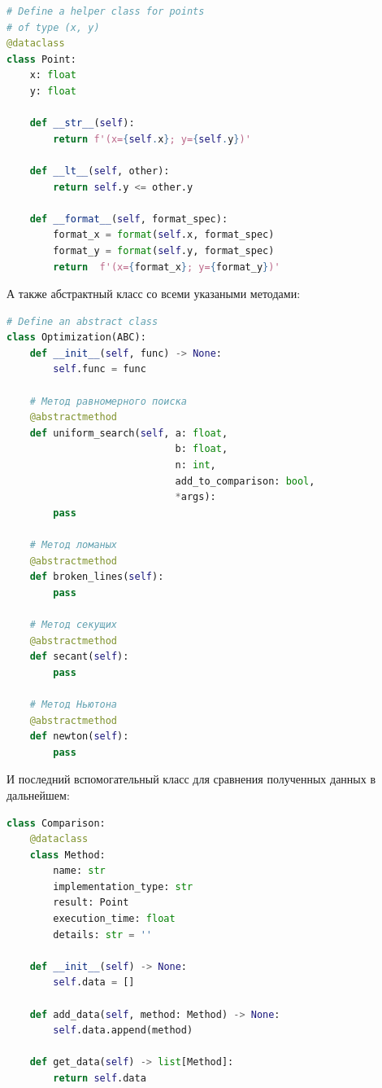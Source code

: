 \documentclass[a4paper, 14pt]{extarticle}
\begin{document}
\begin{center}
    \begin{lstlisting}[language=Python]
# Define a helper class for points 
# of type (x, y)
@dataclass
class Point:
    x: float
    y: float

    def __str__(self):
        return f'(x={self.x}; y={self.y})'
    
    def __lt__(self, other):
        return self.y <= other.y
    
    def __format__(self, format_spec):
        format_x = format(self.x, format_spec)
        format_y = format(self.y, format_spec)
        return  f'(x={format_x}; y={format_y})'
    \end{lstlisting}
\end{center}

А также абстрактный класс со всеми указаными методами:

\begin{center}
    \begin{lstlisting}[language=Python]
# Define an abstract class
class Optimization(ABC):
    def __init__(self, func) -> None:
        self.func = func   

    # Метод равномерного поиска
    @abstractmethod
    def uniform_search(self, a: float, 
                             b: float,
                             n: int,
                             add_to_comparison: bool,
                             *args):
        pass

    # Метод ломаных
    @abstractmethod
    def broken_lines(self):
        pass

    # Метод секущих
    @abstractmethod
    def secant(self):
        pass

    # Метод Ньютона
    @abstractmethod
    def newton(self):
        pass
    \end{lstlisting}
\end{center}

И последний вспомогательный класс для сравнения полученных данных в дальнейшем:

\begin{center}
    \begin{lstlisting}[language=Python]
class Comparison:
    @dataclass
    class Method:
        name: str
        implementation_type: str
        result: Point
        execution_time: float
        details: str = ''

    def __init__(self) -> None:
        self.data = []

    def add_data(self, method: Method) -> None:
        self.data.append(method)
    
    def get_data(self) -> list[Method]:
        return self.data
    \end{lstlisting}
\end{center}
\end{document}
